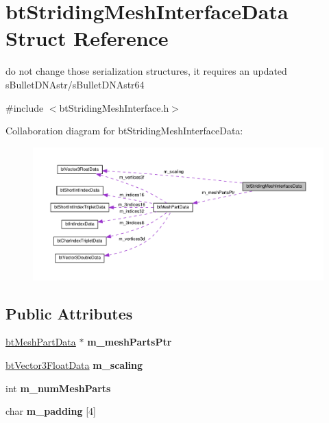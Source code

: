 \hypertarget{structbtStridingMeshInterfaceData}{}\section{bt\+Striding\+Mesh\+Interface\+Data Struct Reference}
\label{structbtStridingMeshInterfaceData}


do not change those serialization structures, it requires an updated s\+Bullet\+D\+N\+Astr/s\+Bullet\+D\+N\+Astr64  




{\ttfamily \#include $<$bt\+Striding\+Mesh\+Interface.\+h$>$}



Collaboration diagram for bt\+Striding\+Mesh\+Interface\+Data\+:
\nopagebreak
\begin{figure}[H]
\begin{center}
\leavevmode
\includegraphics[width=350pt]{structbtStridingMeshInterfaceData__coll__graph}
\end{center}
\end{figure}
\subsection*{Public Attributes}
\begin{DoxyCompactItemize}
\item 
\mbox{\label{structbtStridingMeshInterfaceData_a3fc5d48fd6e5ef26252c0a5039a52a60}} 
\hyperlink{structbtMeshPartData}{bt\+Mesh\+Part\+Data} $\ast$ {\bfseries m\+\_\+mesh\+Parts\+Ptr}
\item 
\mbox{\label{structbtStridingMeshInterfaceData_af5cad63f6d700f3993611d958222c288}} 
\hyperlink{structbtVector3FloatData}{bt\+Vector3\+Float\+Data} {\bfseries m\+\_\+scaling}
\item 
\mbox{\label{structbtStridingMeshInterfaceData_a648047136aef434d7cd738a0175cf80c}} 
int {\bfseries m\+\_\+num\+Mesh\+Parts}
\item 
\mbox{\label{structbtStridingMeshInterfaceData_adef91edc6ad4baebfb34c4ca826b57a8}} 
char {\bfseries m\+\_\+padding} \mbox{[}4\mbox{]}
\end{DoxyCompactItemize}


